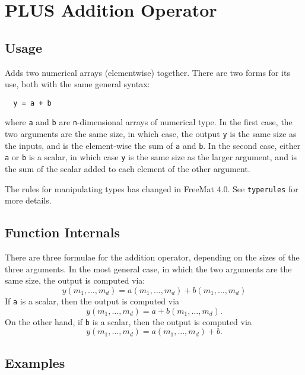 \section{PLUS Addition Operator}

\subsection{Usage}

Adds two numerical arrays (elementwise) together.  There are two forms
for its use, both with the same general syntax:
\begin{verbatim}
  y = a + b
\end{verbatim}
where \verb|a| and \verb|b| are \verb|n|-dimensional arrays of numerical type.  In the
first case, the two arguments are the same size, in which case, the 
output \verb|y| is the same size as the inputs, and is the element-wise the sum 
of \verb|a| and \verb|b|.  In the second case, either \verb|a| or \verb|b| is a scalar, 
in which case \verb|y| is the same size as the larger argument,
and is the sum of the scalar added to each element of the other argument.

The rules for manipulating types has changed in FreeMat 4.0.  See \verb|typerules|
for more details.

\subsection{Function Internals}

There are three formulae for the addition operator, depending on the
sizes of the three arguments.  In the most general case, in which 
the two arguments are the same size, the output is computed via:
\[
y(m_1,\ldots,m_d) = a(m_1,\ldots,m_d) + b(m_1,\ldots,m_d)
\]
If \verb|a| is a scalar, then the output is computed via
\[
y(m_1,\ldots,m_d) = a + b(m_1,\ldots,m_d).
\]
On the other hand, if \verb|b| is a scalar, then the output is computed via
\[
y(m_1,\ldots,m_d) = a(m_1,\ldots,m_d) + b.
\]
\subsection{Examples}

